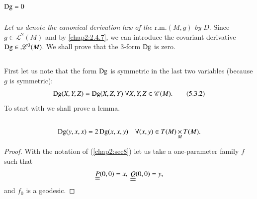 \section{$\operatorname{Dg}=0$}\label{chap5:sec3}

{\em Let us denote the canonical derivation law of the} r.m.\@ $(M,g)$
{\em by} $D$. Since $g\in\mathscr{L}^{2}(M)$ and by \ref{chap2:2.4.7}, we
can introduce the covariant derivative $\operatorname{Dg}\in\mathscr{L}^{3}(M)$. We
shall prove that the 3-form $\operatorname{Dg}$ is zero.

\subsection{}\label{chap5:5.3.1}
First let us note that the form $\operatorname{Dg}$ is symmetric in the last two
variables (because $g$ is symmetric):
\begin{equation*}
\operatorname{Dg}(X,Y,Z)=\operatorname{Dg}(X,Z,Y) \; \forall X,Y,Z\in
\mathscr{C}(M).\tag{5.3.2}\label{chap5:5.3.2} 
\end{equation*}
To start with we shall prove a lemma.

\setcounter{subsection}{2}

\subsection{}\label{chap5:5.3.3}

\begin{lemma*}
$$
\operatorname{Dg}(y,x,x)=2\operatorname{Dg}(x,x,y)\quad \forall (x,y)\in
T(M)\mathop{\times}_{M}T(M).
$$
\end{lemma*}

\begin{proof}
With the notation of (\ref{chap2:sec8}) let us take a one-parameter family
$f$ such that
$$
\uub{P}(0,0)=x, \ \uub{Q}(0,0)=y,
$$
and $f_{0}$ is a geodesic.
\end{proof}

